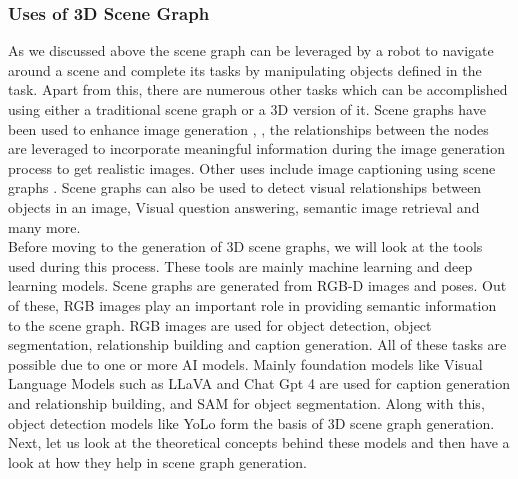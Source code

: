 \subsubsection{Uses of 3D Scene Graph}
As we discussed above the scene graph can be leveraged by a robot to navigate around a scene and complete its tasks by manipulating objects defined in the task. 
Apart from this, there are numerous other tasks which can be accomplished using either a traditional scene graph or a 3D version of it. Scene graphs have been 
used to enhance image generation \cite{tripathi2019usingscenegraphcontext}, \cite{johnson2018imagegenerationscenegraphs}, 
the relationships between the nodes are leveraged to incorporate meaningful information during the image generation process to get realistic images.
 Other uses include image captioning using scene graphs \cite{8953305}. 
 Scene graphs can also be used to detect visual relationships between objects in an image, Visual question answering, semantic image retrieval and many more. \\
Before moving to the generation of 3D scene graphs, we will look at the tools used during this process. 
These tools are mainly machine learning and deep learning models. Scene graphs are generated from RGB-D images and poses. 
Out of these, RGB images play an important role in providing semantic information to the scene graph. RGB images are used for object detection,
object segmentation, relationship building and caption generation. All of these tasks are possible due to one or more AI models.
Mainly foundation models like Visual Language Models such as LLaVA and Chat Gpt 4 are used for caption generation and 
relationship building, and SAM for object segmentation. Along with this, object detection models like YoLo form the basis of 
3D scene graph generation. 
Next, let us look at the theoretical concepts behind these models and then have a look at how they help in scene graph generation.
